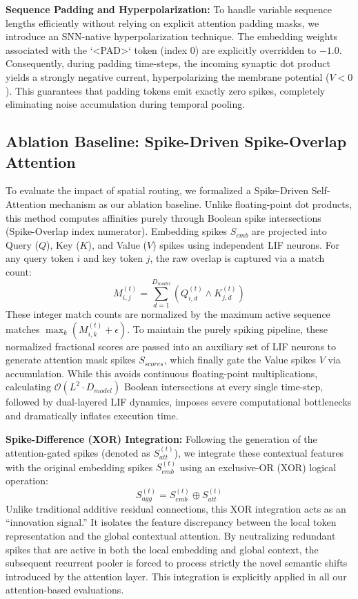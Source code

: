 \documentclass{article} %
\begin{document}
\textbf{Sequence Padding and Hyperpolarization:} To handle variable sequence lengths efficiently without relying on explicit attention padding masks, we introduce an SNN-native hyperpolarization technique. The embedding weights associated with the `<PAD>` token (index 0) are explicitly overridden to $-1.0$. Consequently, during padding time-steps, the incoming synaptic dot product yields a strongly negative current, hyperpolarizing the membrane potential ($V < 0$). This guarantees that padding tokens emit exactly zero spikes, completely eliminating noise accumulation during temporal pooling.

\subsection{Ablation Baseline: Spike-Driven Spike-Overlap Attention}
To evaluate the impact of spatial routing, we formalized a Spike-Driven Self-Attention mechanism as our ablation baseline. Unlike floating-point dot products, this method computes affinities purely through Boolean spike intersections (Spike-Overlap index numerator).
Embedding spikes $S_{emb}$ are projected into Query ($Q$), Key ($K$), and Value ($V$) spikes using independent LIF neurons. For any query token $i$ and key token $j$, the raw overlap is captured via a match count:
\begin{equation}
M_{i,j}^{(t)} = \sum_{d=1}^{D_{model}} \left( Q_{i,d}^{(t)} \wedge K_{j,d}^{(t)} \right)
\end{equation}
These integer match counts are normalized by the maximum active sequence matches $\max_k (M_{i,k}^{(t)} + \epsilon)$. To maintain the purely spiking pipeline, these normalized fractional scores are passed into an auxiliary set of LIF neurons to generate attention mask spikes $S_{scores}$, which finally gate the Value spikes $V$ via accumulation.
While this avoids continuous floating-point multiplications, calculating $\mathcal{O}(L^2 \cdot D_{model})$ Boolean intersections at every single time-step, followed by dual-layered LIF dynamics, imposes severe computational bottlenecks and dramatically inflates execution time.

\textbf{Spike-Difference (XOR) Integration:} Following the generation of the attention-gated spikes (denoted as $S_{att}^{(t)}$), we integrate these contextual features with the original embedding spikes $S_{emb}^{(t)}$ using an exclusive-OR (XOR) logical operation: 
\begin{equation}
S_{agg}^{(t)} = S_{emb}^{(t)} \oplus S_{att}^{(t)}
\end{equation}
Unlike traditional additive residual connections, this XOR integration acts as an ``innovation signal.'' It isolates the feature discrepancy between the local token representation and the global contextual attention. By neutralizing redundant spikes that are active in both the local embedding and global context, the subsequent recurrent pooler is forced to process strictly the novel semantic shifts introduced by the attention layer. This integration is explicitly applied in all our attention-based evaluations.
\end{document}
